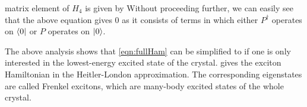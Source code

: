 matrix element of $H_4$ is given by
Without proceeding further, we can easily see that
the above equation gives  0 as it consists of terms in which either $P^{\dagger}$ operates on $\langle 0 |$ or $P$
operates on $| 0 \rangle$. 


The above analysis shows that \autoref{eqn:fullHam} can be simplified to
if one is only interested in the lowest-energy excited state of the crystal. 
 gives the exciton Hamiltonian in the Heitler-London approximation. The corresponding 
eigenstates are called Frenkel excitons, which are many-body excited states of the whole crystal.
 
